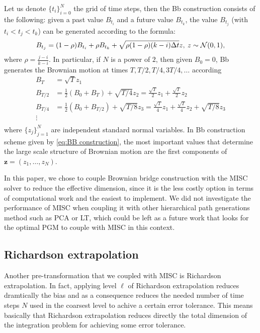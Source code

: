 Let us denote $\{t_i\}_{i=0}^{N}$ the grid of time steps, then the Bb construction \cite{glasserman2004monte} consists of the following: given a past value $B_{t_i}$ and a future value $B_{t_k}$, the value $B_{t_j}$ (with $t_i < t_j < t_k$) can be generated according to the formula:
\begin{equation}
B_{t_j}=(1-\rho) B_{t_i}+\rho B_{t_k}+ \sqrt{\rho (1-\rho)(k-i) \Delta t} z, \: z \sim \mathcal{N}(0,1) ,
\end{equation}
where $\rho=\frac{j-i}{k-i}$.  In particular, if $N$ is a power of $2$, then given $B_0=0$, Bb generates the Brownian motion at times $T, T/2,T/4,3T/4,\dots$ according
\begin{align}\label{eq:BB construction}
	B_T&=\sqrt{T}z_1\nonumber\\
	B_{T/2}&= \frac{1}{2}(B_{0}+B_{T})+\sqrt{T/4}z_2= \frac{\sqrt{T}}{2} z_1+\frac{\sqrt{T}}{2} z_2\nonumber\\
	B_{T/4}&=\frac{1}{2} (B_{0}+B_{T/2})+\sqrt{T/8}z_3= \frac{\sqrt{T}}{4} z_1+\frac{\sqrt{T}}{4} z_2+\sqrt{T/8}z_3\nonumber\\
	\vdots \nonumber\\
\end{align}
where $\{z_j\}_{j=1}^{N}$ are independent standard normal variables.  In Bb construction scheme given by \eqref{eq:BB construction}, the most important values that determine the large scale structure of Brownian motion are the first components of $\mathbf{z} = (z_1,\dots,z_N)$.



\begin{remark}
In this paper, we chose to couple Brownian bridge construction with the MISC solver to reduce the effective dimension, since it is the less costly option in terms of computational work and the easiest to implement. We did not investigate the performance of MISC when coupling it with other hierarchical path generations method such as PCA or LT, which could be left as a future work that looks for the optimal PGM to couple with MISC in this context.
\end{remark}



\subsection{Richardson extrapolation}\label{sec:Richardson extrapolation}


Another  pre-transformation that we coupled with MISC is Richardson extrapolation. In fact, applying level $\ell$ of Richardson extrapolation reduces dramtically the bias and as a consequence reduces the needed number of time steps $N$ used in the coarsest level to achive a certain error tolerance. This means basically that Richardson extrapolation reduces directly the total dimension of the integration problem for achieving some error tolerance.


